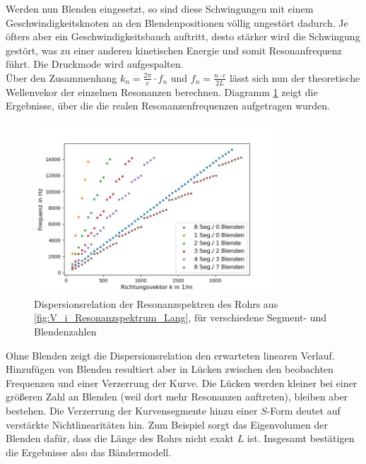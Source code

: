 \documentclass[../main.tex]{subfiles}
\begin{document}
        Werden nun Blenden eingesetzt, so sind diese Schwingungen mit einem Geschwindigkeitsknoten an den Blendenpositionen völlig ungestört dadurch. Je öfters aber ein Geschwindigkeitsbauch auftritt, desto stärker wird die Schwingung gestört, was zu einer anderen kinetischen Energie und somit Resonanfrequenz führt. Die Druckmode wird aufgespalten.\\

        Über den Zusammenhang $k_n = \frac{2\pi}{c}\cdot f_n$ und $f_n =\frac{n\cdot c}{2L}$ lässt sich nun der theoretische Wellenvekor der einzelnen Resonanzen berechnen. Diagramm \ref{fig:V_j_Dispersionsrelation_Lang} zeigt die Ergebnisse, über die die realen Resonanzenfrequenzen aufgetragen wurden.

        \begin{figure}[H]
            \centering
            \includegraphics[width=0.8\textwidth]{Bilddateien/Auswertung/V_j_Dispersionsrelation_Lang.jpg}
            \caption{Dispersionsrelation der Resonanzspektren des Rohrs aus \ref{fig:V_i_Resonanzspektrum_Lang}, für verschiedene Segment- und Blendenzahlen}
            \label{fig:V_j_Dispersionsrelation_Lang}
        \end{figure}

        Ohne Blenden zeigt die Dispersionsrelation den erwarteten linearen Verlauf. Hinzufügen von Blenden resultiert aber in Lücken zwischen den beobachten Frequenzen und einer Verzerrung der Kurve. Die Lücken werden kleiner bei einer größeren Zahl an Blenden (weil dort mehr Resonanzen auftreten), bleiben aber bestehen. Die Verzerrung der Kurvensegmente hinzu einer $S$-Form deutet auf verstärkte Nichtlinearitäten hin. Zum Beispiel sorgt das Eigenvolumen der Blenden dafür, dass die Länge des Rohrs nicht exakt $L$ ist. Insgesamt bestätigen die Ergebnisse also das Bändermodell. 
\end{document}
